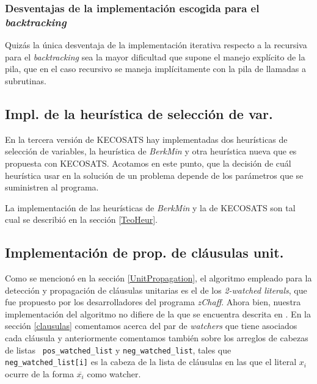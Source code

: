 \documentclass[12pt,lettersize,oneside]{article}
\begin{document}
\subsubsection{Desventajas de la implementación escogida para el \emph{backtracking}}
Quizás la única desventaja de la implementación iterativa respecto a la
recursiva para el \emph{backtracking} sea la mayor dificultad que supone el
manejo explícito de la pila, que en el caso recursivo se maneja implícitamente
con la pila de llamadas a subrutinas.


\subsection{Impl. de  la heurística de selección de var.}\label{heur}

En la tercera versión de KECOSATS hay implementadas dos heurísticas de selección
de variables, la heurística de \emph{BerkMin} y otra heurística nueva que es
propuesta con KECOSATS. Acotamos en este punto, que la decisión de cuál
heurística usar en la solución de un problema depende de los parámetros que se
suministren al programa.

La implementación de las heurísticas de \emph{BerkMin} y la de KECOSATS son tal
cual se describió en la sección \ref{TeoHeur}.


\subsection{Implementación de prop. de cláusulas unit.}
Como se mencionó en la sección \ref{UnitPropagation}, el algoritmo empleado para
la detección y propagación de cláusulas unitarias es el de los \emph{2-watched
  literals}, que fue propuesto por los desarrolladores del programa
\emph{zChaff}. Ahora bien, nuestra implementación del algoritmo no difiere de la
que se encuentra descrita en \cite{Zhang}. En la sección \ref{clausulas}
comentamos acerca del par de \emph{watchers} que tiene asociados cada cláusula y
anteriormente comentamos también sobre los arreglos de cabezas de listas {\tt
  pos\_watched\_list} y {\tt neg\_watched\_list}, tales que  {\tt
  neg\_watched\_list[i]} es la cabeza de la lista de cláusulas en las que el
literal $x_i$ ocurre de la forma $\overline{x_i}$ como watcher.
\end{document}

